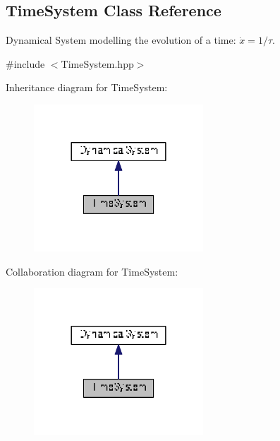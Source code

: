 \hypertarget{classDmpBbo_1_1TimeSystem}{\subsection{Time\+System Class Reference}
\label{classDmpBbo_1_1TimeSystem}
}


Dynamical System modelling the evolution of a time\+: $\dot{x} = 1/\tau$.  




{\ttfamily \#include $<$Time\+System.\+hpp$>$}



Inheritance diagram for Time\+System\+:
\nopagebreak
\begin{figure}[H]
\begin{center}
\leavevmode
\includegraphics[width=180pt]{classDmpBbo_1_1TimeSystem__inherit__graph}
\end{center}
\end{figure}


Collaboration diagram for Time\+System\+:
\nopagebreak
\begin{figure}[H]
\begin{center}
\leavevmode
\includegraphics[width=180pt]{classDmpBbo_1_1TimeSystem__coll__graph}
\end{center}
\end{figure}
